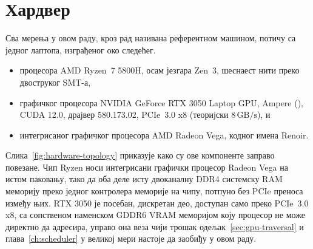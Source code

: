 \documentclass[serbian]{ftndiplomski}
\begin{document}
\section{Хардвер}
\label{sec:hardware}

Сва мерења у овом раду, кроз рад називана референтном машином, потичу са једног
лаптопа, изграђеног око следећег.
\begin{itemize}
  \item процесора AMD Ryzen~7 5800H, осам језгара Zen~3, шеснаест нити преко
  двоструког SMT-а,
  \item графичког процесора NVIDIA GeForce RTX 3050 Laptop GPU, Ampere (),
  CUDA 12.0, драјвер 580.173.02, PCIe~3.0 x8 (теоријски $8\,\mathrm{GB/s}$), и
  \item интегрисаног графичког процесора AMD Radeon Vega, кодног имена Renoir.
\end{itemize}

Слика~\ref{fig:hardware-topology} приказује како су ове компоненте заправо повезане.
Чип Ryzen носи интегрисани графички процесор Radeon Vega на истом паковању, тако да
оба деле исту двоканалну DDR4 системску RAM меморију преко једног контролера меморије
на чипу, потпуно без PCIe преноса између њих. RTX 3050 је посебан, дискретан део,
доступан само преко PCIe~3.0 x8, са сопственом наменском GDDR6 VRAM меморијом коју
процесор не може директно да адресира, управо она веза чији трошак
одељак~\ref{sec:gpu-traversal} и глава~\ref{ch:scheduler} у великој мери настоје да
заобиђу у овом раду.
\end{document}
